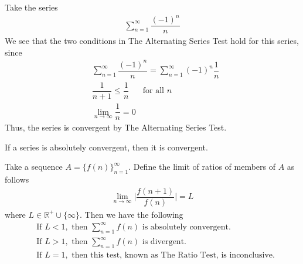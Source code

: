 \begin{example}
Take the series
\begin{align*}
    \sum_{n=1}^{\infty} \dfrac{(-1)^{n}}{n}
\end{align*}
We see that the two conditions in The Alternating Series Test hold for this series, since
\begin{align*}
    &\sum_{n=1}^{\infty} \dfrac{(-1)^{n}}{n} = \sum_{n=1}^{\infty} (-1)^{n}\dfrac{1}{n}\\[2ex]
    &\dfrac{1}{n+1} \leq \dfrac{1}{n} \hspace{20pt} \text{for all} \hspace{4pt} n\\[2ex]
    &\lim_{n \longrightarrow \infty} \dfrac{1}{n} = 0
\end{align*}
Thus, the series is convergent by The Alternating Series Test.
\end{example}

\begin{theorem}
If a series is absolutely convergent, then it is convergent.
\end{theorem}

\begin{theorem}
Take a sequence $A = \{f(n)\}_{n = 1}^{\infty}$. Define the limit of ratios of members of $A$ as follows
\begin{align*}
    \lim_{n \longrightarrow \infty} \Big\lvert \dfrac{f(n+1)}{f(n)} \Big\rvert = L
\end{align*}
where $L \in \mathbb{R^{+}} \cup \{\infty\}$. Then we have the following
\begin{align*}
    &\text{If} \hspace{4pt} L < 1, \hspace{4pt} \text{then} \hspace{4pt} \sum_{n = 1}^{\infty} f(n) \hspace{4pt} \text{is absolutely convergent.}\\[2ex]
    &\text{If} \hspace{4pt} L > 1, \hspace{4pt} \text{then} \hspace{4pt} \sum_{n = 1}^{\infty} f(n) \hspace{4pt} \text{is divergent.}\\[2ex]
    &\text{If} \hspace{4pt} L = 1, \hspace{4pt} \text{then this test, known as The Ratio Test, is inconclusive.}
\end{align*}
\end{theorem}

